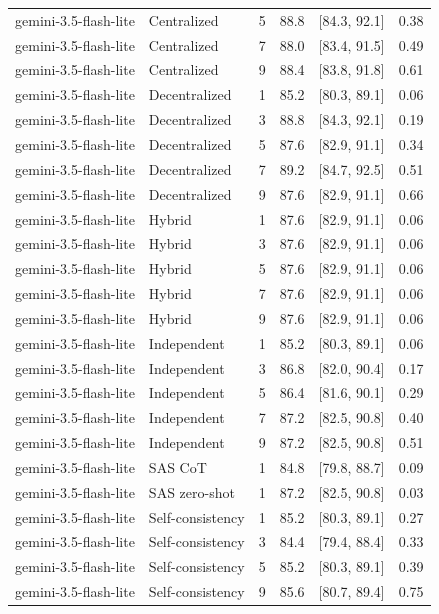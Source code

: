 \begin{tabular}{@{}llrrrr@{}}
gemini-3.5-flash-lite & Centralized & 5 & 88.8 & [84.3, 92.1] & 0.38 \\
gemini-3.5-flash-lite & Centralized & 7 & 88.0 & [83.4, 91.5] & 0.49 \\
gemini-3.5-flash-lite & Centralized & 9 & 88.4 & [83.8, 91.8] & 0.61 \\
gemini-3.5-flash-lite & Decentralized & 1 & 85.2 & [80.3, 89.1] & 0.06 \\
gemini-3.5-flash-lite & Decentralized & 3 & 88.8 & [84.3, 92.1] & 0.19 \\
gemini-3.5-flash-lite & Decentralized & 5 & 87.6 & [82.9, 91.1] & 0.34 \\
gemini-3.5-flash-lite & Decentralized & 7 & 89.2 & [84.7, 92.5] & 0.51 \\
gemini-3.5-flash-lite & Decentralized & 9 & 87.6 & [82.9, 91.1] & 0.66 \\
gemini-3.5-flash-lite & Hybrid & 1 & 87.6 & [82.9, 91.1] & 0.06 \\
gemini-3.5-flash-lite & Hybrid & 3 & 87.6 & [82.9, 91.1] & 0.06 \\
gemini-3.5-flash-lite & Hybrid & 5 & 87.6 & [82.9, 91.1] & 0.06 \\
gemini-3.5-flash-lite & Hybrid & 7 & 87.6 & [82.9, 91.1] & 0.06 \\
gemini-3.5-flash-lite & Hybrid & 9 & 87.6 & [82.9, 91.1] & 0.06 \\
gemini-3.5-flash-lite & Independent & 1 & 85.2 & [80.3, 89.1] & 0.06 \\
gemini-3.5-flash-lite & Independent & 3 & 86.8 & [82.0, 90.4] & 0.17 \\
gemini-3.5-flash-lite & Independent & 5 & 86.4 & [81.6, 90.1] & 0.29 \\
gemini-3.5-flash-lite & Independent & 7 & 87.2 & [82.5, 90.8] & 0.40 \\
gemini-3.5-flash-lite & Independent & 9 & 87.2 & [82.5, 90.8] & 0.51 \\
gemini-3.5-flash-lite & SAS CoT & 1 & 84.8 & [79.8, 88.7] & 0.09 \\
gemini-3.5-flash-lite & SAS zero-shot & 1 & 87.2 & [82.5, 90.8] & 0.03 \\
gemini-3.5-flash-lite & Self-consistency & 1 & 85.2 & [80.3, 89.1] & 0.27 \\
gemini-3.5-flash-lite & Self-consistency & 3 & 84.4 & [79.4, 88.4] & 0.33 \\
gemini-3.5-flash-lite & Self-consistency & 5 & 85.2 & [80.3, 89.1] & 0.39 \\
gemini-3.5-flash-lite & Self-consistency & 9 & 85.6 & [80.7, 89.4] & 0.75 \\

\end{tabular}

